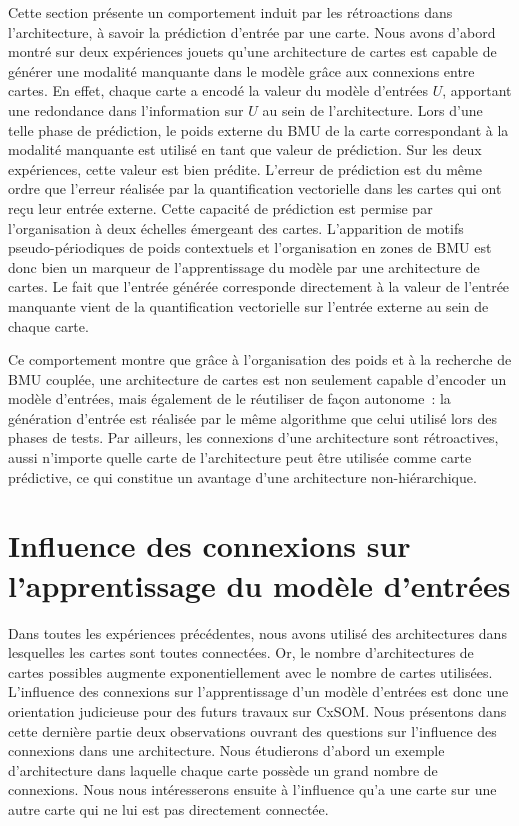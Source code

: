 \documentclass[../main]{subfiles}
\begin{document}
Cette section présente un comportement induit par les rétroactions dans l'architecture, à savoir la prédiction d'entrée par une carte.
Nous avons d'abord montré sur deux expériences jouets qu'une architecture de cartes est capable de générer une modalité manquante dans le modèle grâce aux connexions entre cartes. En effet, chaque carte a encodé la valeur du modèle d'entrées $U$, apportant une redondance dans l'information sur $U$ au sein de l'architecture. 
Lors d'une telle phase de prédiction, le poids externe du BMU de la carte correspondant à la modalité manquante est utilisé en tant que valeur de prédiction.
Sur les deux expériences, cette valeur est bien prédite. L'erreur de prédiction est du même ordre que l'erreur réalisée par la quantification vectorielle dans les cartes qui ont reçu leur entrée externe.
Cette capacité de prédiction est permise par l'organisation à deux échelles émergeant des cartes. L'apparition de motifs pseudo-périodiques de poids contextuels et l'organisation en zones de BMU est donc bien un marqueur de l'apprentissage du modèle par une architecture de cartes. 
Le fait que l'entrée générée corresponde directement à la valeur de l'entrée manquante vient de la quantification vectorielle sur l'entrée externe au sein de chaque carte.

Ce comportement montre que grâce à l'organisation des poids et à la recherche de BMU couplée, une architecture de cartes est non seulement capable d'encoder un modèle d'entrées, mais également de le réutiliser de façon autonome~: la génération d'entrée est réalisée par le même algorithme que celui utilisé lors des phases de tests.
Par ailleurs, les connexions d'une architecture sont rétroactives, aussi n'importe quelle carte de l'architecture peut être utilisée comme carte prédictive, ce qui constitue un avantage d'une architecture non-hiérarchique.


\section{Influence des connexions sur l'apprentissage du modèle d'entrées}

Dans toutes les expériences précédentes, nous avons utilisé des architectures dans lesquelles les cartes sont toutes connectées. Or, le nombre d'architectures de cartes possibles augmente exponentiellement avec le nombre de cartes utilisées.
L'influence des connexions sur l'apprentissage d'un modèle d'entrées est donc une orientation judicieuse pour des futurs travaux sur CxSOM.
Nous présentons dans cette dernière partie deux observations ouvrant des questions sur l'influence des connexions dans une architecture.
Nous étudierons d'abord un exemple d'architecture dans laquelle chaque carte possède un grand nombre de connexions.
Nous nous intéresserons ensuite à l'influence qu'a une carte sur une autre carte qui ne lui est pas directement connectée.
\end{document}
